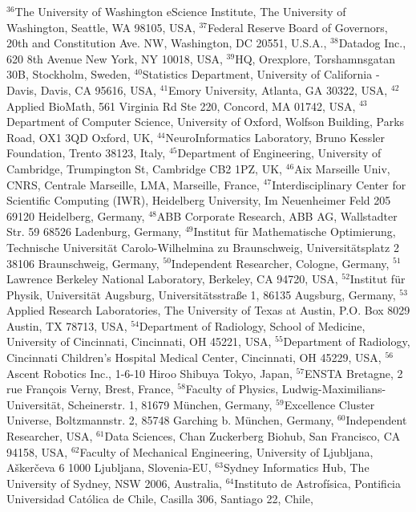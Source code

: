 $^{36}$The University of Washington eScience Institute, The University of Washington, Seattle, WA 98105, USA, 
$^{37}$Federal Reserve Board of Governors,  20th and Constitution Ave. NW, Washington, DC 20551, U.S.A., 
$^{38}$Datadog Inc., 620 8th Avenue New York, NY 10018, USA, 
$^{39}$HQ, Orexplore, Torshamnsgatan 30B, Stockholm, Sweden, 
$^{40}$Statistics Department, University of California - Davis, Davis, CA 95616, USA, 
$^{41}$Emory University, Atlanta, GA 30322, USA, 
$^{42}$Applied BioMath, 561 Virginia Rd Ste 220, Concord, MA 01742, USA, 
$^{43}$Department of Computer Science, University of Oxford, Wolfson Building, Parks Road, OX1 3QD Oxford, UK, 
$^{44}$NeuroInformatics Laboratory, Bruno Kessler Foundation, Trento 38123, Italy, 
$^{45}$Department of Engineering, University of Cambridge, Trumpington St, Cambridge CB2 1PZ, UK, 
$^{46}$Aix Marseille Univ, CNRS, Centrale Marseille, LMA, Marseille, France, 
$^{47}$Interdisciplinary Center for Scientific Computing (IWR), Heidelberg University, Im Neuenheimer Feld 205 69120 Heidelberg, Germany, 
$^{48}$ABB Corporate Research, ABB AG, Wallstadter Str. 59 68526 Ladenburg, Germany, 
$^{49}$Institut f\"ur Mathematische Optimierung, Technische Universit\"at Carolo-Wilhelmina zu Braunschweig, Universit\"atsplatz 2 38106 Braunschweig, Germany, 
$^{50}$Independent Researcher, Cologne, Germany, 
$^{51}$Lawrence Berkeley National Laboratory, Berkeley, CA 94720, USA, 
$^{52}$Institut f{\"u}r Physik, Universit{\"a}t Augsburg, Universit{\"a}tsstra{\ss}e 1, 86135 Augsburg, Germany, 
$^{53}$Applied Research Laboratories, The University of Texas at Austin, P.O. Box 8029 Austin, TX 78713, USA, 
$^{54}$Department of Radiology, School of Medicine, University of Cincinnati, Cincinnati, OH 45221, USA, 
$^{55}$Department of Radiology, Cincinnati Children's Hospital Medical Center, Cincinnati, OH 45229, USA, 
$^{56}$Ascent Robotics Inc., 1-6-10 Hiroo Shibuya Tokyo, Japan, 
$^{57}$ENSTA Bretagne, 2 rue François Verny, Brest, France, 
$^{58}$Faculty of Physics, Ludwig-Maximilians-Universit\"at, Scheinerstr. 1, 81679 M\"unchen, Germany, 
$^{59}$Excellence Cluster Universe, Boltzmannstr. 2, 85748 Garching b. M\"unchen, Germany, 
$^{60}$Independent Researcher, USA, 
$^{61}$Data Sciences, Chan Zuckerberg Biohub, San Francisco, CA 94158, USA, 
$^{62}$Faculty of Mechanical Engineering, University of Ljubljana, A\v{s}ker\v{c}eva 6 1000 Ljubljana, Slovenia-EU, 
$^{63}$Sydney Informatics Hub, The University of Sydney, NSW 2006, Australia, 
$^{64}$Instituto de Astrof\'{i}sica, Pontificia Universidad Cat\'{o}lica de Chile, Casilla 306, Santiago 22, Chile, 
